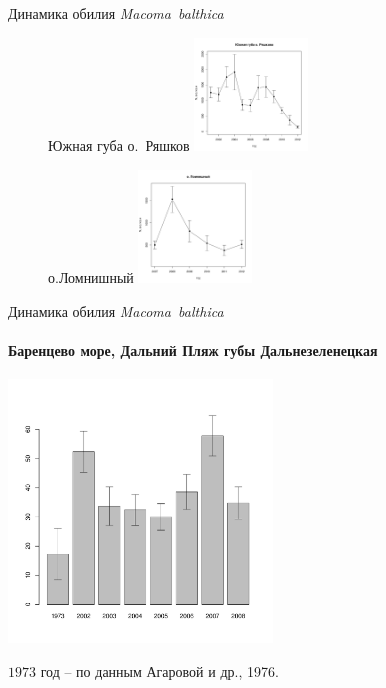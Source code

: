 \documentclass{beamer}
\begin{document}
\begin{frame}{Динамика обилия {\it Macoma~balthica}}
\begin{figure}
\begin{minipage}[b]{.3\linewidth}
\begin{center}
	\end{center}
	\end{minipage}
\hfil %
	\begin{minipage}[b]{.3\linewidth}
	\begin{center}
\tiny{Южная губа о.~Ряшков}
\includegraphics[width=30mm]{../White_Sea/Ryashkov_YuG/N2_dynamic.pdf}
	\end{center}
	\end{minipage}
\hfil %
	\begin{minipage}[b]{.3\linewidth}
	\begin{center}
\tiny{о.Ломнишный}
\includegraphics[width=30mm]{../White_Sea/Lomnishniy/N2_dynamic.pdf}
	\end{center}
	\end{minipage}
\end{figure}
\end{frame}

\begin{frame}{Динамика обилия {\it Macoma~balthica}}
\framesubtitle{Баренцево море, Дальний Пляж губы Дальнезеленецкая}
\begin{center}
\includegraphics[width=70mm]{../Barenc_Sea/Dalnezeleneckaya/N_dynamic_with_Agarova.pdf}
\end{center}
\tiny{$1973$ год -- по данным Агаровой и др., 1976.}
\end{frame}
\end{document}

